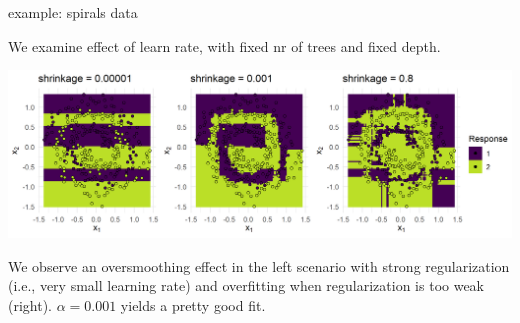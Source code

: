 \documentclass[11pt,compress,t,notes=noshow, xcolor=table]{beamer}
\begin{document}
\begin{vbframe}{example: spirals data}

We examine effect of learn rate, with fixed nr of trees and fixed depth.

\vfill

\includegraphics[width = \textwidth]{figure/gbm_regu_oversmoothing_overfitting}

\vfill

We observe an oversmoothing effect in the left scenario with strong 
regularization (i.e., very small learning rate) and overfitting when 
regularization is too weak (right). $\alpha = 0.001$  yields a pretty good fit.

\end{vbframe}
\end{document}

